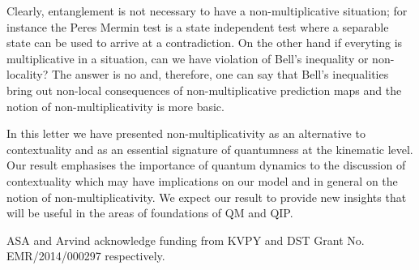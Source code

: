 \documentclass[british,aps,prl,superscriptaddress,nofootinbib,times,reprint]{revtex4-1}
\theoremstyle{plain}
\theoremstyle{plain}
\theoremstyle{definition}
\theoremstyle{remark}
\theoremstyle{remark}
\theoremstyle{remark}
\theoremstyle{plain}
\theoremstyle{plain}
\theoremstyle{plain}
\theoremstyle{definition}
\theoremstyle{definition}
\begin{document}
Clearly, entanglement is not necessary to have a
non-multiplicative situation; for instance the
Peres Mermin test is a state independent test
where a separable state can be used to arrive at a
contradiction. On the other hand if everyting is
multiplicative in a situation, can we have
violation of Bell's inequality or non-locality?
The answer is no and, therefore, one can say that
Bell's inequalities bring out  non-local
consequences of  non-multiplicative prediction
maps and the notion of non-multiplicativity is
more basic.  


In this letter we have presented
non-multiplicativity as an alternative to
contextuality and as an essential signature of
quantumness at the kinematic level. {\color{red} Our result
emphasises the importance of quantum dynamics
to the discussion of contextuality which may have
implications on our model and in general on the
notion of non-multiplicativity.}
We expect {\color{red}our result} to provide new insights that will be useful
in the areas of foundations of QM and QIP.

\begin{acknowledgments} ASA and Arvind acknowledge
funding from KVPY and DST Grant No.
EMR/2014/000297 respectively.
\end{acknowledgments}
%
 
\end{document}
